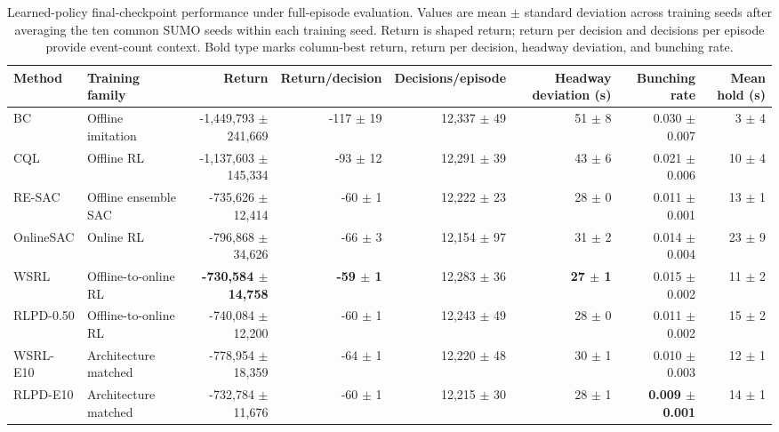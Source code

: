 \begin{table}[t]
\centering
\caption{Learned-policy final-checkpoint performance under full-episode evaluation. Values are mean $\pm$ standard deviation across training seeds after averaging the ten common SUMO seeds within each training seed. Return is shaped return; return per decision and decisions per episode provide event-count context. Bold type marks column-best return, return per decision, headway deviation, and bunching rate.}
\label{tab:learned-final-checkpoint}
\scriptsize
\renewcommand{\arraystretch}{1.00}
\setlength{\tabcolsep}{1.5pt}
\begin{tabular}{@{}llrrrrrr@{}}
\toprule
Method & Training family & Return & Return/decision & Decisions/episode & Headway deviation (s) & Bunching rate & Mean hold (s) \\
\midrule
BC & Offline imitation & -1,449,793 $\pm$ 241,669 & -117 $\pm$ 19 & 12,337 $\pm$ 49 & 51 $\pm$ 8 & 0.030 $\pm$ 0.007 & 3 $\pm$ 4 \\
CQL & Offline RL & -1,137,603 $\pm$ 145,334 & -93 $\pm$ 12 & 12,291 $\pm$ 39 & 43 $\pm$ 6 & 0.021 $\pm$ 0.006 & 10 $\pm$ 4 \\
RE-SAC & Offline ensemble SAC & -735,626 $\pm$ 12,414 & -60 $\pm$ 1 & 12,222 $\pm$ 23 & 28 $\pm$ 0 & 0.011 $\pm$ 0.001 & 13 $\pm$ 1 \\
OnlineSAC & Online RL & -796,868 $\pm$ 34,626 & -66 $\pm$ 3 & 12,154 $\pm$ 97 & 31 $\pm$ 2 & 0.014 $\pm$ 0.004 & 23 $\pm$ 9 \\
WSRL & Offline-to-online RL & \textbf{-730,584 $\pm$ 14,758} & \textbf{-59 $\pm$ 1} & 12,283 $\pm$ 36 & \textbf{27 $\pm$ 1} & 0.015 $\pm$ 0.002 & 11 $\pm$ 2 \\
RLPD-0.50 & Offline-to-online RL & -740,084 $\pm$ 12,200 & -60 $\pm$ 1 & 12,243 $\pm$ 49 & 28 $\pm$ 0 & 0.011 $\pm$ 0.002 & 15 $\pm$ 2 \\
WSRL-E10 & Architecture matched & -778,954 $\pm$ 18,359 & -64 $\pm$ 1 & 12,220 $\pm$ 48 & 30 $\pm$ 1 & 0.010 $\pm$ 0.003 & 12 $\pm$ 1 \\
RLPD-E10 & Architecture matched & -732,784 $\pm$ 11,676 & -60 $\pm$ 1 & 12,215 $\pm$ 30 & 28 $\pm$ 1 & \textbf{0.009 $\pm$ 0.001} & 14 $\pm$ 1 \\
\bottomrule
\end{tabular}
\end{table}
